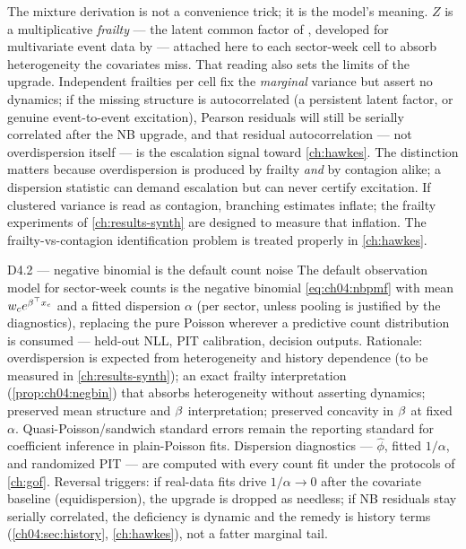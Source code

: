 The mixture derivation is not a convenience trick; it is the model's
meaning. $Z$ is a multiplicative \emph{frailty} --- the latent common
factor of \citet{vaupel1979}, developed for multivariate event data by
\citet{hougaard2000} --- attached here to each sector-week cell to absorb
heterogeneity the covariates miss. That reading also sets the limits of
the upgrade. Independent frailties per cell fix the
\emph{marginal} variance but assert no dynamics; if the missing structure
is autocorrelated (a persistent latent factor, or genuine
event-to-event excitation), Pearson residuals will still be serially
correlated after the NB upgrade, and that residual autocorrelation ---
not overdispersion itself --- is the escalation signal toward
\cref{ch:hawkes}. The distinction matters because overdispersion is
produced by frailty \emph{and} by contagion alike; a dispersion
statistic can demand escalation but can never certify excitation. If
clustered variance is read as contagion, branching estimates inflate;
the frailty experiments of \cref{ch:results-synth} are designed to
measure that inflation. The frailty-vs-contagion
identification problem is treated properly in \cref{ch:hawkes}.

\begin{decision}{D4.2 --- negative binomial is the default count noise}
The default observation model for sector-week counts is the negative
binomial \cref{eq:ch04:nbpmf} with mean $w_c e^{\beta^{\top}x_c}$ and a
fitted dispersion $\alpha$ (per sector, unless pooling is justified by
the diagnostics), replacing the pure Poisson wherever a predictive count
distribution is consumed --- held-out NLL, PIT calibration, decision
outputs. Rationale: overdispersion is expected from heterogeneity and
history dependence (to be measured in \cref{ch:results-synth}); an exact
frailty interpretation
(\cref{prop:ch04:negbin}) that absorbs heterogeneity without asserting
dynamics; preserved mean structure and $\beta$ interpretation;
preserved concavity in $\beta$ at fixed $\alpha$. Quasi-Poisson/sandwich
standard errors remain the reporting standard for coefficient inference
in plain-Poisson fits. Dispersion diagnostics --- $\hat\phi$, fitted
$1/\alpha$, and randomized PIT --- are computed with every count fit
under the protocols of \cref{ch:gof}. Reversal triggers: if real-data
fits drive $1/\alpha \to 0$ after the covariate baseline (equidispersion),
the upgrade is dropped as needless; if NB residuals stay serially
correlated, the deficiency is dynamic and the remedy is history terms
(\cref{ch04:sec:history}, \cref{ch:hawkes}), not a fatter marginal tail.
\end{decision}

